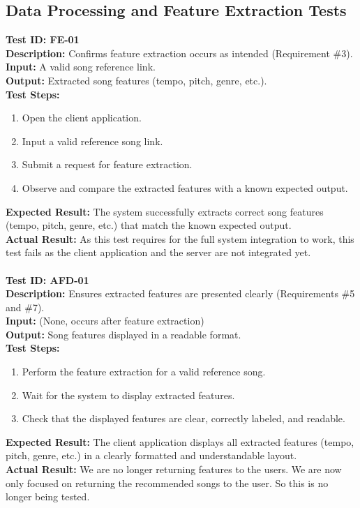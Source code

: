 \documentclass[12pt, titlepage]{article}
\begin{document}
\subsection{Data Processing and Feature Extraction Tests}
\textbf{Test ID: FE-01}\\
\textbf{Description:} Confirms feature extraction occurs as intended (Requirement \#3).\\
\textbf{Input:} A valid song reference link.\\
\textbf{Output:} Extracted song features (tempo, pitch, genre, etc.).\\
\textbf{Test Steps:}
\begin{enumerate}
    \item Open the client application.
    \item Input a valid reference song link.
    \item Submit a request for feature extraction.
    \item Observe and compare the extracted features with a known expected output.
\end{enumerate}
\textbf{Expected Result:} The system successfully extracts correct song features (tempo, pitch, genre, etc.) that match the known expected output.\\
\textbf{Actual Result:} As this test requires for the full system integration to work, this test fails as the client application and the server are not integrated yet.
\\ \\
\textbf{Test ID: AFD-01}\\
\textbf{Description:} Ensures extracted features are presented clearly (Requirements \#5 and \#7).\\
\textbf{Input:} (None, occurs after feature extraction)\\
\textbf{Output:} Song features displayed in a readable format.\\
\textbf{Test Steps:}
\begin{enumerate}
    \item Perform the feature extraction for a valid reference song.
    \item Wait for the system to display extracted features.
    \item Check that the displayed features are clear, correctly labeled, and readable.
\end{enumerate}
\textbf{Expected Result:} The client application displays all extracted features (tempo, pitch, genre, etc.) in a clearly formatted and understandable layout.\\
\textbf{Actual Result:} We are no longer returning features to the users. We are now only focused on returning the recommended songs to the user. So this is no longer being tested.
\end{document}
